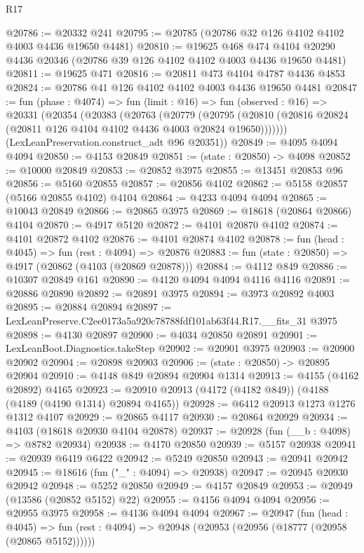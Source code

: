 \begin{lexlean}{R17}
\begin{coremodule}
@20786 := @20332 @241
@20795 := @20785 (@20786 @32 @126 @4102 @4102 @4003 @4436 @19650 @4481)
@20810 := @19625
    @468
    @474
    @4104
    @20290
    @4436
    @20346
    (@20786 @39 @126 @4102 @4102 @4003 @4436 @19650 @4481)
@20811 := @19625 @471
@20816 := @20811 @473 @4104 @4787 @4436 @4853
@20824 := @20786 @41 @126 @4102 @4102 @4003 @4436 @19650 @4481
@20847 := fun (phase : @4074) =>
  fun (limit : @16) =>
  fun (observed : @16) =>
  @20331
    (@20354
      (@20383
        (@20763
          (@20779
            (@20795 (@20810 (@20816 @20824 (@20811 @126 @4104 @4102 @4436 @4003 @20824 @19650)))))))
      (LexLeanPreservation.construct_adt @96 @20351))
@20849 := @4095 @4094 @4094
@20850 := @4153 @20849
@20851 := (state : @20850) -> @4098
@20852 := @10000 @20849
@20853 := @20852 @3975
@20855 := @13451 @20853 @96
@20856 := @5160 @20855
@20857 := @20856 @4102
@20862 := @5158 @20857 (@5166 @20855 @4102) @4104
@20864 := @4233 @4094 @4094
@20865 := @10043 @20849
@20866 := @20865 @3975
@20869 := @18618 (@20864 @20866) @4104
@20870 := @4917 @5120
@20872 := @4101 @20870 @4102
@20874 := @4101 @20872 @4102
@20876 := @4101 @20874 @4102
@20878 := fun (head : @4045) => fun (rest : @4094) => @20876
@20883 := fun (state : @20850) => @4917 (@20862 (@4103 (@20869 @20878)))
@20884 := @4112 @849
@20886 := @10307 @20849 @161
@20890 := @4120 @4094 @4094 @4116 @4116
@20891 := @20886 @20890
@20892 := @20891 @3975
@20894 := @3973 @20892 @4003
@20895 := @20884 @20894
@20897 := LexLeanPreserve.C2ee0173a5a920c78788fdf101ab63f44.R17.__fits_31 @3975
@20898 := @4130 @20897
@20900 := @4034 @20850 @20891
@20901 := LexLeanBoot.Diagnostics.takeStep
@20902 := @20901 @3975
@20903 := @20900 @20902
@20904 := @20898 @20903
@20906 := (state : @20850) -> @20895 @20904
@20910 := @4148 @849 @20894 @20904 @1314
@20913 := @4155 (@4162 @20892) @4165
@20923 := @20910 @20913 (@4172 (@4182 @849)) (@4188 (@4189 (@4190 @1314) @20894 @4165))
@20928 := @6412 @20913 @1273 @1276 @1312 @4107
@20929 := @20865 @4117
@20930 := @20864 @20929
@20934 := @4103 (@18618 @20930 @4104 @20878)
@20937 := @20928 (fun (__b : @4098) => @8782 @20934)
@20938 := @4170 @20850
@20939 := @5157 @20938
@20941 := @20939 @6419 @6422
@20942 := @5249 @20850
@20943 := @20941 @20942
@20945 := @18616 (fun ("_" : @4094) => @20938)
@20947 := @20945 @20930 @20942
@20948 := @5252 @20850
@20949 := @4157 @20849
@20953 := @20949 (@13586 (@20852 @5152) @22)
@20955 := @4156 @4094 @4094
@20956 := @20955 @3975
@20958 := @4136 @4094 @4094
@20967 := @20947
    (fun (head : @4045) =>
    fun (rest : @4094) => @20948 (@20953 (@20956 (@18777 (@20958 (@20865 @5152))))))

\end{coremodule}
\end{lexlean}
